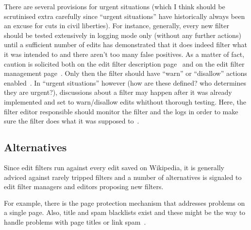 \documentclass{sigchi}
\begin{document}
There are several provisions for urgent situations (which I think should be scrutinised extra carefully since ``urgent situations'' have historically always been an excuse for cuts in civil liberties).
For instance, generally, every new filter should be tested extensively in logging mode only (without any further actions) until a sufficient number of edits has demonstrated that it does indeed filter what it was intended to and there aren't too many false positives.
As a matter of fact, caution is solicited both on the edit filter description page~\cite{Wikipedia:EditFilter} and on the edit filter management page~\cite{Wikipedia:EditFilterManagement}.
Only then the filter should have ``warn'' or ``disallow'' actions enabled~\cite{Wikipedia:EditFilter}.
In ``urgent situations'' however (how are these defined? who determines they are urgent?), discussions about a filter may happen after it was already implemented and set to warn/disallow edits whithout thorough testing.
Here, the filter editor responsible should monitor the filter and the logs in order to make sure the filter does what it was supposed to~\cite{Wikipedia:EditFilter}.

\subsection{Alternatives}

Since edit filters run against every edit saved on Wikipedia, it is generally adviced against rarely tripped filters and a number of alternatives is signaled to edit filter managers and editors proposing new filters.

For example, there is the page protection mechanism that addresses problems on a single page.
Also, title and spam blacklists exist and these might be the way to handle problems with page titles or link spam~\cite{Wikipedia:EditFilter}.
\end{document}
